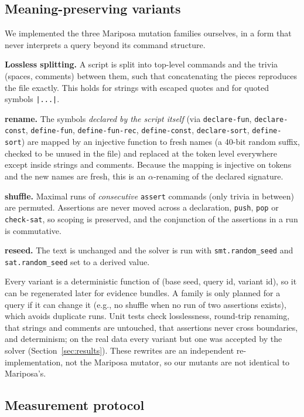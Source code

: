 \documentclass[11pt]{article}
\begin{document}
\subsection{Meaning-preserving variants}
\label{sec:variants}

We implemented the three Mariposa mutation families ourselves, in a form that never interprets a query beyond its command structure.

\textbf{Lossless splitting.} A script is split into top-level commands and the trivia (spaces, comments) between them, such that concatenating the pieces reproduces the file exactly. This holds for strings with escaped quotes and for quoted symbols \texttt{|...|}.

\textbf{rename.} The symbols \emph{declared by the script itself} (via \texttt{declare-fun}, \texttt{declare-const}, \texttt{define-fun}, \texttt{define-fun-rec}, \texttt{define-const}, \texttt{declare-sort}, \texttt{define-sort}) are mapped by an injective function to fresh names (a 40-bit random suffix, checked to be unused in the file) and replaced at the token level everywhere except inside strings and comments. Because the mapping is injective on tokens and the new names are fresh, this is an $\alpha$-renaming of the declared signature.

\textbf{shuffle.} Maximal runs of \emph{consecutive} \texttt{assert} commands (only trivia in between) are permuted. Assertions are never moved across a declaration, \texttt{push}, \texttt{pop} or \texttt{check-sat}, so scoping is preserved, and the conjunction of the assertions in a run is commutative.

\textbf{reseed.} The text is unchanged and the solver is run with \texttt{smt.random\_seed} and \texttt{sat.random\_seed} set to a derived value.

Every variant is a deterministic function of (base seed, query id, variant id), so it can be regenerated later for evidence bundles. A family is only planned for a query if it can change it (e.g., no shuffle when no run of two assertions exists), which avoids duplicate runs. Unit tests check losslessness, round-trip renaming, that strings and comments are untouched, that assertions never cross boundaries, and determinism; on the real data every variant but one was accepted by the solver (Section~\ref{sec:results}). These rewrites are an independent re-implementation, not the Mariposa mutator, so our mutants are not identical to Mariposa's.

\subsection{Measurement protocol}
\label{sec:measure}
\end{document}
